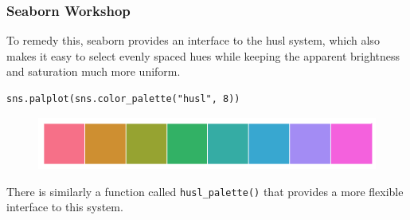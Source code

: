 \documentclass{beamer}
\begin{document}
\begin{frame}[fragile]
\frametitle{Seaborn Workshop}
\large

To remedy this, seaborn provides an interface to the husl system, which also makes it easy to select evenly spaced hues while keeping the apparent brightness and saturation much more uniform.
\begin{verbatim}
sns.palplot(sns.color_palette("husl", 8))
\end{verbatim}

\begin{figure}
\centering
\includegraphics[width=0.7\linewidth]{images/color_palettes_14_0}
\end{figure}

There is similarly a function called \texttt{husl\_palette()} that provides a more flexible interface to this system.
\end{frame}
\end{document}
